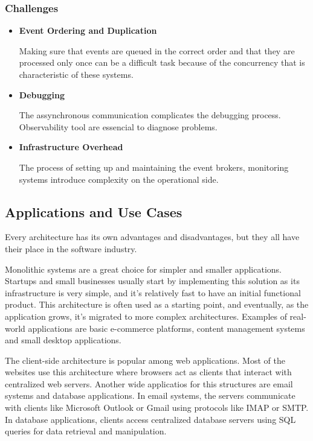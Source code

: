 \subsubsection{Challenges}
\begin{itemize}
	\item \textbf{Event Ordering and Duplication}

	      Making sure that events are queued in the correct order and that they are
	      processed only once can be a difficult task because of the concurrency
	      that is characteristic of these systems.

	\item \textbf{Debugging}

	      The assynchronous communication complicates the debugging process.
	      Observability tool are essencial to diagnose problems.

	\item \textbf{Infrastructure Overhead}

	      The process of setting up and maintaining the event brokers, monitoring
	      systems introduce complexity on the operational side.
\end{itemize}

\subsection{Applications and Use Cases}
Every architecture has its own advantages and disadvantages, but they all have
their place in the software industry.

Monolithic systems are a great choice for simpler and smaller applications.
Startups and small businesses usually start by implementing this solution as
its infrastructure is very simple, and it's relatively fast to have an initial
functional product. This architecture is often used as a starting point, and
eventually, as the application grows, it's migrated to more complex architectures.
Examples of real-world applications are basic e-commerce platforms, content
management systems and small desktop applications.

The client-side architecture is popular among web applications. Most of the
websites use this architecture where browsers act as clients that interact with
centralized web servers. Another wide applicatios for this structures are email
systems and database applications. In email systems, the servers communicate
with clients like Microsoft Outlook or Gmail using protocols like IMAP or SMTP.
In database applications, clients access centralized database servers using
SQL queries for data retrieval and manipulation.

